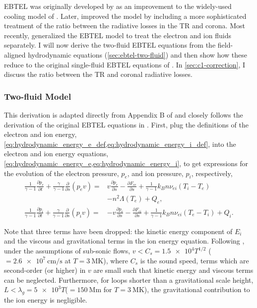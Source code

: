 EBTEL was originally developed by \citet{klimchuk_highly_2008} as an improvement to the widely-used cooling model of \citet{cargill_implications_1994}. Later, \citet{cargill_enthalpy-based_2012} improved the model by including a more sophisticated treatment of the ratio between the radiative losses in the TR and corona. Most recently, \citet{barnes_inference_2016} generalized the EBTEL model to treat the electron and ion fluids separately. I will now derive the two-fluid EBTEL equations from the field-aligned hydrodynamic equations (\autoref{sec:ebtel-two-fluid}) and then show how these reduce to the original single-fluid EBTEL equations of \citet{klimchuk_highly_2008,cargill_enthalpy-based_2012}. In \autoref{sec:c1-correction}, I discuss the ratio between the TR and coronal radiative losses.

\subsubsection{Two-fluid Model}\label{sec:ebtel-two-fluid}

This derivation is adapted directly from Appendix B of \citet[\autoref{ch:inferring_hot_plasma} of this thesis]{barnes_inference_2016} and closely follows the derivation of the original EBTEL equations in \citet{klimchuk_highly_2008,cargill_enthalpy-based_2012}. First, plug the definitions of the electron and ion energy, \cref{eq:hydrodynamic_energy_e_def,eq:hydrodynamic_energy_i_def}, into the electron and ion energy equations, \cref{eq:hydrodynamic_energy_e,eq:hydrodynamic_energy_i}, to get expressions for the evolution of the electron pressure, $p_e$, and ion pressure, $p_i$, respectively,
\begin{align}
    \frac{1}{\gamma - 1}\frac{\partial p_e}{\partial t} + \frac{\gamma}{\gamma - 1}\frac{\partial}{\partial s}(p_ev) =& v\frac{\partial p_e}{\partial s} - \frac{\partial F_{ce}}{\partial s} + \frac{1}{\gamma - 1}k_Bn\nu_{ei}(T_i-T_e) \label{eq:1denergy_e_simp} \\
    &- n^2\Lambda(T_e) + Q_{e}, \nonumber \\
    \frac{1}{\gamma - 1}\frac{\partial p_i}{\partial t} + \frac{\gamma}{\gamma - 1}\frac{\partial }{\partial s}(p_iv) =& -v\frac{\partial p_e}{\partial s} - \frac{\partial F_{ci}}{\partial s} + \frac{1}{\gamma - 1}k_Bn\nu_{ei}(T_e-T_i) + Q_{i}. \label{eq:1denergy_i_simp}
\end{align}

Note that three terms have been dropped: the kinetic energy component of $E_i$ and the viscous and gravitational terms in the ion energy equation. Following \citet{klimchuk_highly_2008}, under the assumptions of sub-sonic flows, $v<C_s=\num{1.5e4}T^{1/2}$ ($=\SI{2.6e7}{\cm\per\second}$ at $T=\SI{3}{\mega\kelvin}$), where $C_s$ is the sound speed, terms which are second-order (or higher) in $v$ are small such that kinetic energy and viscous terms can be neglected. Furthermore, for loops shorter than a gravitational scale height, $L<\lambda_g=\num{5e3}T$($=\SI{150}{\mega\m}$ for $T=\SI{3}{\mega\kelvin}$), the gravitational contribution to the ion energy is negligible.

